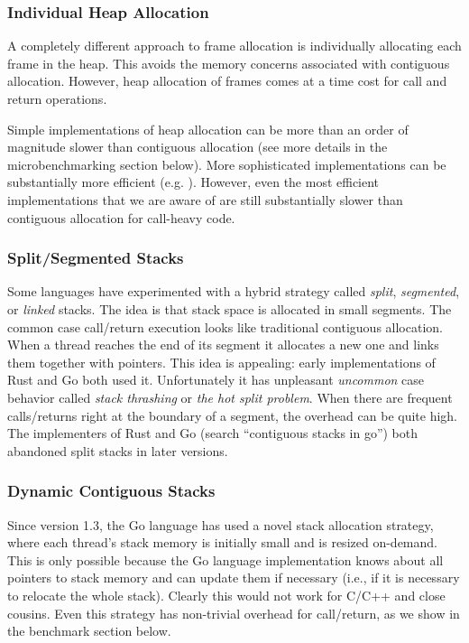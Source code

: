 \documentclass[a4paper,UKenglish,cleveref, autoref]{lipics-v2019}
\begin{document}
\subsubsection{Individual Heap Allocation}

A completely different approach to frame allocation is individually allocating each frame in the heap.
This avoids the memory concerns associated with contiguous allocation.
However, heap allocation of frames comes at a time cost for call and return operations.

Simple implementations of heap allocation can be more than an order of magnitude slower than contiguous allocation (see more details in the microbenchmarking section below).
More sophisticated implementations can be substantially more efficient (e.g. \cite{Shao2000}).
However, even the most efficient implementations that we are aware of are still substantially slower than contiguous allocation for call-heavy code.

\subsubsection{Split/Segmented Stacks}

Some languages have experimented with a hybrid strategy called \emph{split}, \emph{segmented}, or \emph{linked} stacks.
The idea is that stack space is allocated in small segments.
The common case call/return execution looks like traditional contiguous allocation.
When a thread reaches the end of its segment it allocates a new one and links them together with pointers.
This idea is appealing: early implementations of Rust and Go both used it.
Unfortunately it has unpleasant \emph{uncommon} case behavior called \emph{stack thrashing} or \emph{the hot split problem}.
When there are frequent calls/returns right at the boundary of a segment, the overhead can be quite high.
The implementers of Rust \cite{Anderson2013} and Go (search ``contiguous stacks in go'') both abandoned split stacks in later versions.


\subsubsection{Dynamic Contiguous Stacks}

Since version 1.3, the Go language has used a novel stack allocation strategy, where each thread's stack memory is initially small and is resized on-demand.
This is only possible because the Go language implementation knows about all pointers to stack memory and can update them if necessary (i.e., if it is necessary to relocate the whole stack).
Clearly this would not work for C/C++ and close cousins.
Even this strategy has non-trivial overhead for call/return, as we show in the benchmark section below.
\end{document}

